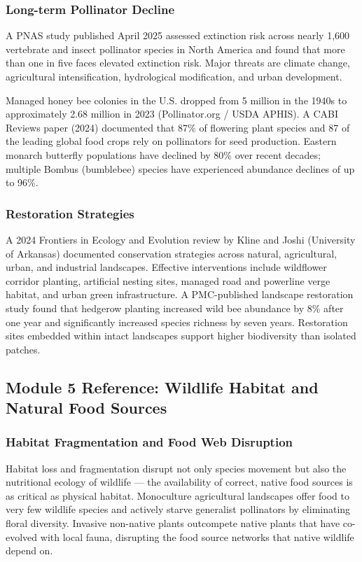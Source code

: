 \documentclass[11pt,letterpaper]{article}
\begin{document}
\subsubsection{Long-term Pollinator Decline}

A PNAS study published April 2025 assessed extinction risk across nearly 1,600 vertebrate and insect pollinator species in North America and found that more than one in five faces elevated extinction risk. Major threats are climate change, agricultural intensification, hydrological modification, and urban development.

Managed honey bee colonies in the U.S. dropped from 5 million in the 1940s to approximately 2.68 million in 2023 (Pollinator.org / USDA APHIS). A CABI Reviews paper (2024) documented that 87\% of flowering plant species and 87 of the leading global food crops rely on pollinators for seed production. Eastern monarch butterfly populations have declined by 80\% over recent decades; multiple Bombus (bumblebee) species have experienced abundance declines of up to 96\%.

\subsubsection{Restoration Strategies}

A 2024 Frontiers in Ecology and Evolution review by Kline and Joshi (University of Arkansas) documented conservation strategies across natural, agricultural, urban, and industrial landscapes. Effective interventions include wildflower corridor planting, artificial nesting sites, managed road and powerline verge habitat, and urban green infrastructure. A PMC-published landscape restoration study found that hedgerow planting increased wild bee abundance by 8\% after one year and significantly increased species richness by seven years. Restoration sites embedded within intact landscapes support higher biodiversity than isolated patches.

\subsection{Module 5 Reference: Wildlife Habitat and Natural Food Sources}

\subsubsection{Habitat Fragmentation and Food Web Disruption}

Habitat loss and fragmentation disrupt not only species movement but also the nutritional ecology of wildlife --- the availability of correct, native food sources is as critical as physical habitat. Monoculture agricultural landscapes offer food to very few wildlife species and actively starve generalist pollinators by eliminating floral diversity. Invasive non-native plants outcompete native plants that have co-evolved with local fauna, disrupting the food source networks that native wildlife depend on.
\end{document}
